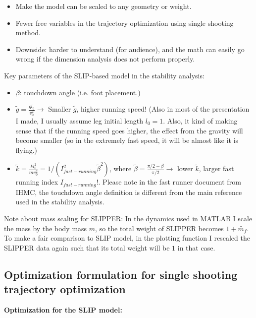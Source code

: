 \begin{itemize}
	\item Make the model can be scaled to any geometry or weight.
	\item Fewer free variables in the trajectory optimization using single shooting method.
	\item Downside: harder to understand (for audience), and the math can easily go wrong if the dimension analysis does not perform properly.
\end{itemize}

\noindent Key parameters of the SLIP-based model in the stability analysis:

\begin{itemize}
	\item $\beta$: touchdown angle (i.e. foot placement.)
	\item $\tilde g = \frac{gl_0}{v_0^2} \rightarrow$ Smaller $\tilde g$, higher running speed! (Also in most of the presentation I made, I usually assume leg initial length $l_0=1$. Also, it kind of making sense that if the running speed goes higher, the effect from the gravity will become smaller (so in the extremely fast speed, it will be almost like it is flying.)
	\item $\tilde k = \frac{kl_0^2}{mv_0^2} = 1/(I^2_{fast-running}\tilde \beta^2)$, where $\tilde\beta = \frac{\pi/2-\beta}{\pi/2} \rightarrow$ lower $\tilde{k}$, larger fast running index $I_{fast-running}$!. Please note in the fast runner document from IHMC, the touchdown angle definition is different from the main reference \cite{Shen2016} used in the stability analysis.
\end{itemize}

\noindent Note about mass scaling for SLIPPER: In the dynamics used in MATLAB I scale the mass by the body mass $m$, so the total weight of SLIPPER becomes $1+\tilde{m_f}$. To make a fair comparison to SLIP model, in the plotting function I rescaled the SLIPPER data again such that its total weight will be $1$ in that case.


\subsection{Optimization formulation for single shooting trajectory optimization}

\noindent \textbf{Optimization for the SLIP model:}\\


